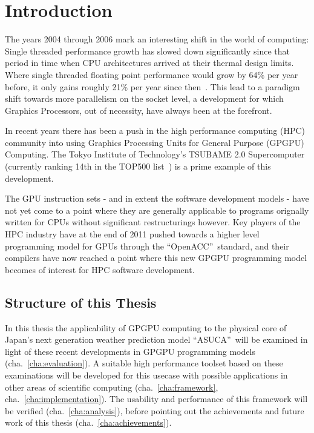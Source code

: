 \chapter{Introduction} \label{cha:intro}

The years 2004 through 2006 mark an interesting shift in the world of computing: Single threaded performance growth has slowed down significantly since that period in time when CPU architectures arrived at their thermal design limits. Where single threaded floating point performance would grow by 64\% per year before, it only gains roughly 21\% per year since then~\cite{SingleThreadCPUPerf}. This lead to a paradigm shift towards more parallelism on the socket level, a development for which Graphics Processors, out of necessity, have always been at the forefront. 

In recent years there has been a push in the high performance computing (HPC) community into using Graphics Processing Units for General Purpose (GPGPU) Computing. The Tokyo Institute of Technology's TSUBAME 2.0 Supercomputer (currently ranking 14th in the TOP500 list~\cite{TsubameTop500}) is a prime example of this development. 

The GPU instruction sets - and in extent the software development models - have not yet come to a point where they are generally applicable to programs orignally written for CPUs without significant restructurings however. Key players of the HPC industry have at the end of 2011 pushed towards a higher level programming model for GPUs through the \textquotedblleft OpenACC\textquotedblright\ standard, and their compilers have now reached a point where this new GPGPU programming model becomes of interest for HPC software development.

\section{Structure of this Thesis}

In this thesis the applicability of GPGPU computing to the physical core of Japan's next generation weather prediction model \textquotedblleft ASUCA\textquotedblright\ will be examined in light of these recent developments in GPGPU programming models (cha.~\ref{cha:evaluation}). A suitable high performance toolset based on these examinations will be developed for this usecase with possible applications in other areas of scientific computing (cha.~\ref{cha:framework}, cha.~\ref{cha:implementation}). The usability and performance of this framework will be verified (cha.~\ref{cha:analysis}), before pointing out the achievements and future work of this thesis (cha.~\ref{cha:achievements}).

